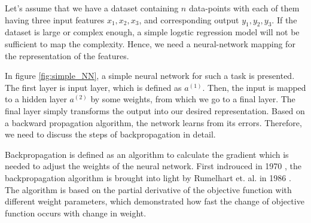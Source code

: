 Let's assume that we have a dataset containing $n$ data-points with each of them having three input features $x_1, x_2, x_3$, and corresponding output $y_1, y_2, y_3$. If the dataset is large or complex enough, a simple logstic regression model will not be sufficient to map the complexity. Hence, we need a neural-network mapping for the representation of the features. 

In figure \ref{fig:simple_NN}, a simple neural network for such a task is presented. The first layer is input layer, which is defined as $a^{(1)}$. Then, the input is mapped to a hidden layer $a^{(2)}$ by some weights, from which we go to a final layer. The final layer simply transforms the output into our desired representation. Based on a backward propagation algorithm, the network learns from its errors. Therefore, we need to discuss the steps of backpropagation in detail. 

Backpropagation is defined as an algorithm to calculate the gradient which is needed to adjust the weights of the neural network. First indrouced in 1970 \cite{linnainmaa1970representation}, the backpropagation algorithm is brought into light by Rumelhart et. al. in 1986 \cite{Bacprop_hinton}. The algorithm is based on the partial derivative of the objective function with different weight parameters, which demonstrated how fast the change of objective function occurs with change in weight. 

